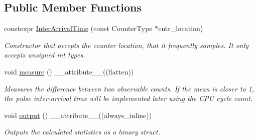 \subsection*{Public Member Functions}
\begin{DoxyCompactItemize}
\item 
constexpr \hyperlink{classInterArrivalTime_a2b5ea12da6c38e85b7e92403abcade5f}{Inter\+Arrival\+Time} (const Counter\+Type $\ast$cntr\+\_\+location)
\begin{DoxyCompactList}\small\item\em Constructor that accepts the counter location, that it frequently samples. It only accepts {\ttfamily unsigned int} types. \end{DoxyCompactList}\item 
void \hyperlink{classInterArrivalTime_a2da37f684151d0cfefb97b50fcffd9a0}{measure} () \+\_\+\+\_\+attribute\+\_\+\+\_\+((flatten))
\begin{DoxyCompactList}\small\item\em Measures the difference between two {\itshape observable} counts. If the mean is closer to 1, the pulse inter-\/arrival time will be implemented later using the C\+PU cycle count. \end{DoxyCompactList}\item 
void \hyperlink{classInterArrivalTime_a8a12081f1132d4a2c7a3898b01897c8d}{output} () \+\_\+\+\_\+attribute\+\_\+\+\_\+((always\+\_\+inline))
\begin{DoxyCompactList}\small\item\em Outputs the calculated statistics as a binary struct. \end{DoxyCompactList}\end{DoxyCompactItemize}
